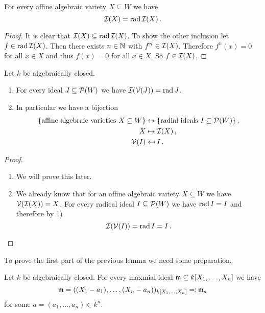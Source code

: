 \begin{lemma}
  For every affine algebraic variety $X \subseteq W$ we have
  \[
    \mathcal{I}(X)
  = \operatorname{rad} \mathcal{I}(X) \,.
  \]
\end{lemma}
\begin{proof}
  It is clear that $\mathcal{I}(X) \subseteq \operatorname{rad} \mathcal{I}(X)$.
  To show the other inclusion let \mbox{$f \in \operatorname{rad} \mathcal{I}(X)$}.
  Then there exists $n \in \mathbb{N}$ with $f^n \in \mathcal{I}(X)$.
  Therefore $f^n(x) = 0$ for all $x \in X$ and thus $f(x) = 0$ for all $x \in X$.
  So $f \in \mathcal{I}(X)$.
\end{proof}


\begin{proposition}
  Let $k$ be algebraically closed.
  \begin{enumerate}[label=\emph{\alph*)},leftmargin=*]
    \item
      For every ideal $J \subseteq \mathcal{P}(W)$ we have $\mathcal{I}(\mathcal{V}(J)) = \operatorname{rad} J$.
    \item
      In particular we have a bijection
      \begin{align*}
                          \{\text{affine algebraic varieties $X \subseteq W$}\}
        &\leftrightarrow  \{\text{radial ideals $I \subseteq \mathcal{P}(W)$}\} \,,  \\
                          X
        &\mapsto          \mathcal{I}(X) \,, \\
                          \mathcal{V}(I)
        &\mapsfrom        I \,.
    \end{align*}
  \end{enumerate}
\end{proposition}
\begin{proof}
  \begin{enumerate}[label=\emph{\alph*)},leftmargin=*]
    \item
      We will prove this later.
    \item
      We already know that for an affine algebraic variety $X \subseteq W$ we have $\mathcal{V}(\mathcal{I}(X)) = X$.
      For every radical ideal $I \subseteq \mathcal{P}(W)$ we have $\operatorname{rad} I = I$ and therefore by 1)
      \[
          \mathcal{I}(\mathcal{V}(I))
        = \operatorname{rad} I
        = I \,.
        \qedhere
      \]
  \end{enumerate}
\end{proof}


To prove the first part of the previous lemma we need some preparation.


\begin{theorem}
  Let $k$ be algebraically closed.
  For every maxmial ideal \mbox{$\mathfrak{m} \subseteq k[X_1, \dotsc, X_n]$} we have
  \[
              \mathfrak{m}
    =         ( (X_1 - a_1), \dotsc, (X_n - a_n) )_{k[X_1, \dotsc, X_n]}
    \eqqcolon \mathfrak{m}_a
  \]
  for some $a = (a_1, \dotsc, a_n) \in k^n$.
\end{theorem}


